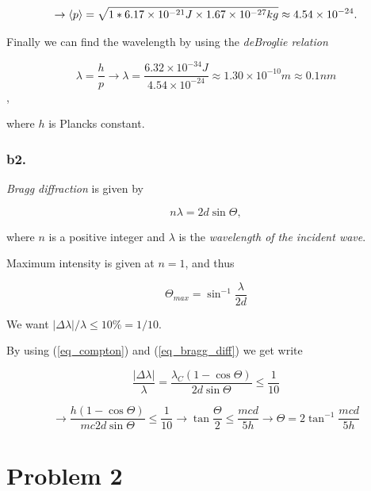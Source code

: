 \documentclass{article}
\begin{document}
\begin{equation}
\rightarrow \braket{p} = \sqrt{1*6.17\times 10^{-21}J\times 1.67\times 10^{-27}kg} \approx 4.54\times 10^{-24}.
\end{equation}

Finally we can find the wavelength by using the \textit{deBroglie relation} 

\begin{equation}
\lambda = \frac{h}{p} \rightarrow \lambda = \frac{6.32\times 10^{-34}J}{4.54\times 10^{-24}} \approx 1.30\times 10^{-10}m \approx 0.1nm
\end{equation},

where $h$ is Plancks constant.

\subsubsection*{b2.}

\textit{Bragg diffraction} is given by

\begin{equation}
n\lambda = 2d\sin{\Theta}, \label{eq_bragg_diff}
\end{equation}

where $n$ is a positive integer and $\lambda$ is the \textit{wavelength of the incident wave}.

Maximum intensity is given at $n=1$, and thus

\begin{equation}
\Theta_{max} = \sin^{-1}{\frac{\lambda}{2d}}
\end{equation}

We want $|\Delta \lambda|/\lambda \leq 10\% = 1/10$.

By using (\ref{eq_compton}) and (\ref{eq_bragg_diff}) we get write

\begin{equation}
\frac{|\Delta \lambda|}{\lambda} = \frac{\lambda_C(1 - \cos{\Theta})}{2d\sin{\Theta}} \leq \frac{1}{10}
\end{equation}

\begin{equation}
\rightarrow \frac{h(1 - \cos{\Theta})}{mc2d\sin{\Theta}} \leq \frac{1}{10} \rightarrow \tan{\frac{\Theta}{2}} \leq \frac{mcd}{5h} \rightarrow \Theta = 2\tan^{-1}{\frac{mcd}{5h}}
\end{equation}

\section*{Problem 2}
\end{document}
